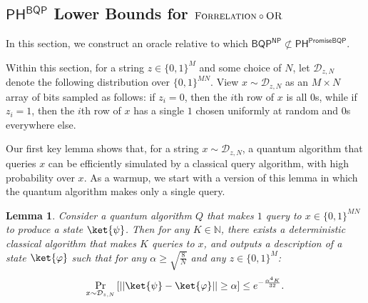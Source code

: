 \documentclass[10pt,a4paper]{article}
\newtheorem{lemma}[theorem]{Lemma}
\newcommand{\Naturals}{\mathbb{N}}
\newcommand{\OR}{\normalfont\textsc{OR}}
\newcommand{\Forrelation}{\normalfont\textsc{Forrelation}}
\begin{document}
\subsection{\texorpdfstring{$\mathsf{PH}^{\mathsf{BQP}}$}{PH\^{}BQP} Lower Bounds for \texorpdfstring{$\Forrelation \circ \OR$}{FORRELATION of ORs}}
In this section, we construct an oracle relative to which $\mathsf{BQP}^\mathsf{NP} \not\subset \mathsf{PH}^\mathsf{PromiseBQP}$.

Within this section, for a string $z \in \{0,1\}^M$ and some choice of $N$, let $\mathcal{D}_{z,N}$ denote the following distribution over $\{0,1\}^{MN}$. View $x \sim \mathcal{D}_{z,N}$ as an $M \times N$ array of bits sampled as follows: if $z_i = 0$, then the $i$th row of $x$ is all $0$s, while if $z_i = 1$, then the $i$th row of $x$ has a single $1$ chosen uniformly at random and $0$s everywhere else.

Our first key lemma shows that, for a string $x \sim \mathcal{D}_{z,N}$, a quantum algorithm that queries $x$ can be efficiently simulated by a classical query algorithm, with high probability over $x$. As a warmup, we start with a version of this lemma in which the quantum algorithm makes only a single query.

\begin{lemma}
\label{lem:sparse_aaronson_ambainis_single_query}
Consider a quantum algorithm $Q$ that makes $1$ query to $x \in \{0,1\}^{MN}$ to produce a state $\ket{\psi}$. Then for any $K \in \Naturals$, there exists a deterministic classical algorithm that makes $K$ queries to $x$, and outputs a description of a state $\ket{\varphi}$ such that for any $\alpha \ge \sqrt{\frac{8}{N}}$ and any $z \in \{0,1\}^M$:
\[
\Pr_{x \sim \mathcal{D}_{z,N}} \left[|| \ket{\psi} - \ket{\varphi}|| \ge \alpha \right] \le e^{-\frac{\alpha^4 K}{32}}.
\]
\end{lemma}
\end{document}
